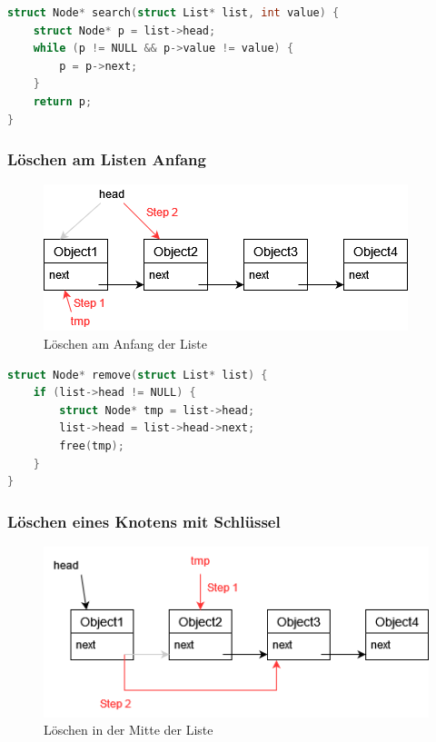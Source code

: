 \documentclass{article}
\begin{document}
\begin{lstlisting}[language=c, tabsize=4]
struct Node* search(struct List* list, int value) {
    struct Node* p = list->head;
    while (p != NULL && p->value != value) {
        p = p->next;
    }
    return p;
}
\end{lstlisting}

\subsubsection{Löschen am Listen Anfang}

\begin{figure}[h!]
  \centering
  \includegraphics[scale=0.6]{list_delete_front.png}
  \caption{Löschen am Anfang der Liste}
  \label{fig:list_delete_front}
\end{figure}

\begin{lstlisting}[language=c, tabsize=4]
struct Node* remove(struct List* list) {
    if (list->head != NULL) {
        struct Node* tmp = list->head;
        list->head = list->head->next;
        free(tmp);
    }
}
\end{lstlisting}
\newpage

\subsubsection{Löschen eines Knotens mit Schlüssel}

\begin{figure}[h!]
  \centering
  \includegraphics[scale=0.6]{list_delete.png}
  \caption{Löschen in der Mitte der Liste}
  \label{fig:list_delete}
\end{figure}
\end{document}
